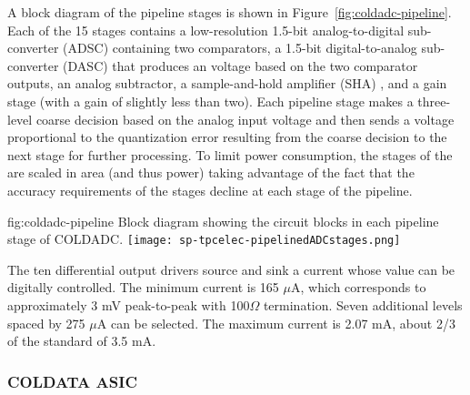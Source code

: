 A block diagram of the  pipeline stages is shown in Figure~\ref{fig:coldadc-pipeline}.  Each of the 15 stages contains a low-resolution 1.5-bit analog-to-digital sub-converter (ADSC)  containing two comparators, a 1.5-bit digital-to-analog sub-converter (DASC)  that produces an voltage based on the two comparator outputs, an analog subtractor, a sample-and-hold amplifier (SHA) , and a gain stage (with a gain of slightly less than two).  Each pipeline stage makes a three-level coarse decision based on the analog input voltage and then sends a voltage proportional to the quantization error resulting from the coarse decision to the next stage for further processing.  To limit power consumption, the stages of the  are scaled in area (and thus power) taking advantage of the fact that the accuracy requirements of the stages decline at each stage of the pipeline.

\begin{dunefigure}
{fig:coldadc-pipeline}
{Block diagram showing the circuit blocks in each pipeline stage of COLDADC.}
\texttt{[image: sp-tpcelec-pipelinedADCstages.png]}
\end{dunefigure}


The ten differential output drivers source and sink a current whose value can be digitally controlled.  The minimum current is 165 $\mu$A, which corresponds to approximately 3 mV peak-to-peak with 100$\Omega$ termination.  Seven additional levels spaced by 275 $\mu$A can be selected.  The maximum current is 2.07 mA, about 2/3 of the  standard of 3.5 mA.


\subsubsection{COLDATA ASIC}
\label{sec:fdsp-tpcelec-design-femb-coldata}

